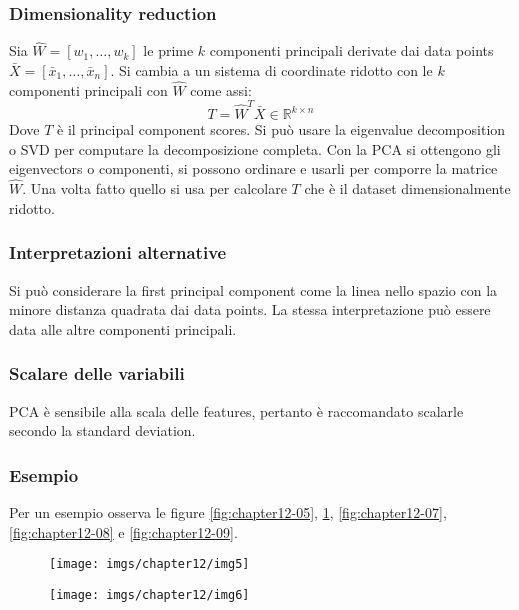 		\subsubsection{Dimensionality reduction}
		Sia $\hat{W} = [w_1,\dots,w_k]$ le prime $k$ componenti principali derivate dai data points $\bar{X} = [\bar{x}_1,\dots,\bar{x}_n]$.
		Si cambia a un sistema di coordinate ridotto con le $k$ componenti principali con $\hat{W}$ come assi:
		$$T = \hat{W}^T\bar{X}\in\mathbb{R}^{k\times n}$$
		Dove $T$ \`e il principal component scores.
		Si pu\`o usare la eigenvalue decomposition o SVD per computare la decomposizione completa.
		Con la PCA si ottengono gli eigenvectors o componenti, si possono ordinare e usarli per comporre la matrice $\hat{W}$.
		Una volta fatto quello si usa per calcolare $T$ che \`e il dataset dimensionalmente ridotto.
		
		\subsubsection{Interpretazioni alternative}
		Si pu\`o considerare la first principal component come la linea nello spazio con la minore distanza quadrata dai data points.
		La stessa interpretazione pu\`o essere data alle altre componenti principali.
		
		\subsubsection{Scalare delle variabili}
		PCA \`e sensibile alla scala delle features, pertanto \`e raccomandato scalarle secondo la standard deviation.
		
		\subsubsection{Esempio}
		
		Per un esempio osserva le figure \ref{fig:chapter12-05}, \ref{fig:chapter12-06}, \ref{fig:chapter12-07}, \ref{fig:chapter12-08} e \ref{fig:chapter12-09}.
		
		
		\begin{figure}
			\centering
			\begin{minipage}{.5\textwidth}
				\centering
				\texttt{[image: imgs/chapter12/img5]}
				\caption{}
				\label{fig:chapter12-05}
			\end{minipage}%
			\begin{minipage}{.5\textwidth}
				\centering
				\texttt{[image: imgs/chapter12/img6]}
				\caption{}
				\label{fig:chapter12-06}
			\end{minipage}
		\end{figure}
		
